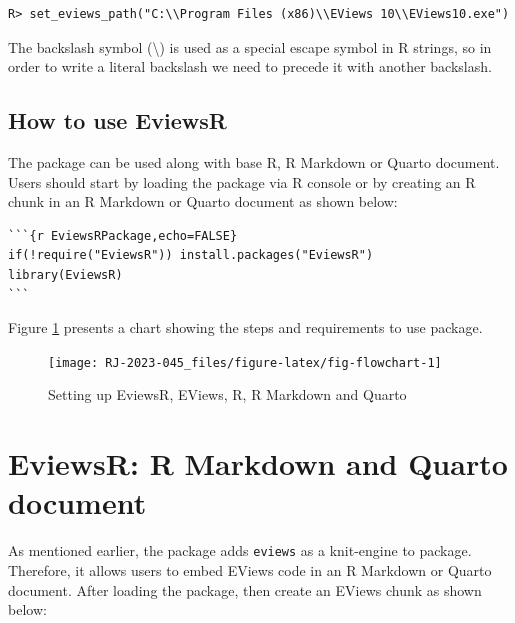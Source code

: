 \begin{verbatim}
R> set_eviews_path("C:\\Program Files (x86)\\EViews 10\\EViews10.exe")
\end{verbatim}

The backslash symbol (\textbackslash) is used as a special escape symbol in R strings, so in order to write a literal backslash we need to precede it with another backslash.

\hypertarget{sec-use}{%
\subsection{How to use EviewsR}\label{sec-use}}

The package  can be used along with base R, R Markdown or Quarto document. Users should start by loading the  package via R console or by creating an R chunk in an R Markdown or Quarto document as shown below:

\begin{verbatim}
```{r EviewsRPackage,echo=FALSE}                    
if(!require("EviewsR")) install.packages("EviewsR")    
library(EviewsR)
```
\end{verbatim}

Figure \ref{fig:fig-flowchart} presents a chart showing the steps and requirements to use  package.

\begin{figure}

{\centering \texttt{[image: RJ-2023-045\_files/figure-latex/fig-flowchart-1]} 

}

\caption{Setting up EviewsR, EViews, R, R Markdown and Quarto}\label{fig:fig-flowchart}
\end{figure}

\hypertarget{sec-document}{%
\section{EviewsR: R Markdown and Quarto document}\label{sec-document}}

As mentioned earlier, the  package adds \texttt{eviews} as a knit-engine to  package. Therefore, it allows users to embed EViews code in an R Markdown or Quarto document. After loading the package, then create an EViews chunk as shown below:

